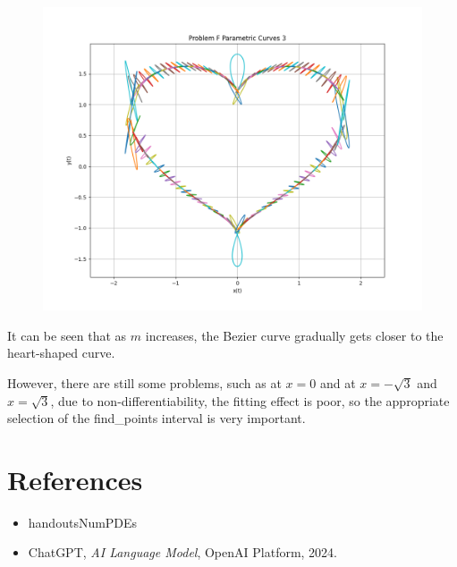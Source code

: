 \documentclass[a4paper]{article}
\begin{document}
\begin{figure}[h]
    \centering
    \includegraphics[width=0.5\linewidth]{Pictures/ProblemF_3.png}
    \label{fig:enter-label}
\end{figure}

It can be seen that as \( m \) increases, the Bezier curve gradually gets closer to the heart-shaped curve.

However, there are still some problems, such as at \( x=0 \) and at \( x = -\sqrt3 \) and \( x = \sqrt3 \), due to non-differentiability, the fitting effect is poor, so the appropriate selection of the find\_points interval is very important.

\section*{References}
\begin{itemize}
   \item handoutsNumPDEs
   \item ChatGPT, \textit{AI Language Model}, OpenAI Platform, 2024.
\end{itemize}
\end{document}
